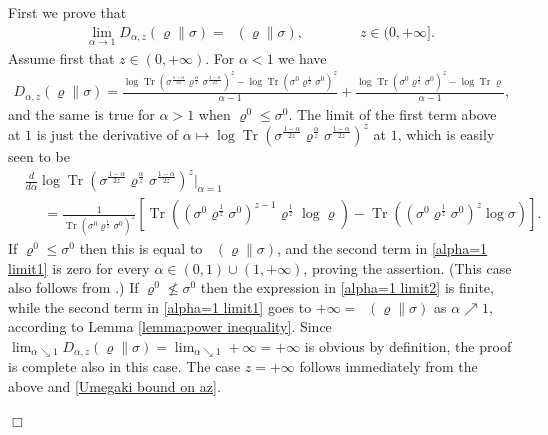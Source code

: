 \documentclass[unsortedaddress,superscriptaddress,pra,notitlepage]{revtex4}
\newenvironment{proof}[1][Proof]{\begin{trivlist}
\item[\hskip \labelsep {\bfseries #1}]}{\hfill$\Box$\end{trivlist}}
\newcommand{\nn}{\nonumber \\}
\def\rho{\varrho}
\def\bz{\left(}
\def\jz{\right)}
\def\nn{\nonumber}
\newcommand{\ds}{\mbox{ }\mbox{ }}
\DeclareMathOperator{\Tr}{Tr}
\DeclareMathOperator{\DU}{\mathit{D}^{Um}}
\begin{document}
\begin{proof}
First we prove that 
\begin{align}\label{alpha=1 limit3}
\lim_{\alpha\to 1}D_{\alpha,z}(\rho\|\sigma)
=
\DU(\rho\|\sigma),\ds\ds\ds z\in(0,+\infty].
\end{align}
Assume first that $z\in(0,+\infty)$.
For $\alpha<1$ we have
\begin{align}\label{alpha=1 limit1}
D_{\alpha,z}(\rho\|\sigma)=
\frac{\log\Tr\bz\sigma^{\frac{1-\alpha}{2z}}\rho^{\frac{\alpha}{z}}\sigma^{\frac{1-\alpha}{2z}}\jz^z
-\log\Tr\bz\sigma^0\rho^{\frac{1}{z}}\sigma^0\jz^z}{\alpha-1}
+\frac{\log\Tr\bz\sigma^0\rho^{\frac{1}{z}}\sigma^0\jz^z-\log\Tr\rho}{\alpha-1},
\end{align}
and the same is true for $\alpha>1$ when $\rho^0\le\sigma^0$.
The limit of the first term above at $1$ is just the derivative of 
$\alpha\mapsto\log\Tr\bz\sigma^{\frac{1-\alpha}{2z}}\rho^{\frac{\alpha}{z}}\sigma^{\frac{1-\alpha}{2z}}\jz^z$
at $1$, which is easily seen to be 
\begin{align}\label{alpha=1 limit2}
&\frac{d}{d\alpha}\log\Tr\bz\sigma^{\frac{1-\alpha}{2z}}\rho^{\frac{\alpha}{z}}\sigma^{\frac{1-\alpha}{2z}}\jz^z\Big\vert_{\alpha=1}\nn\\
&\ds=
\frac{1}{\Tr\bz\sigma^0\rho^{\frac{1}{z}}\sigma^0\jz^z}
\left[\Tr\bz\bz\sigma^0\rho^{\frac{1}{z}}\sigma^0\jz^{z-1}\rho^{\frac{1}{z}}\log\rho\jz
-\Tr\bz\bz\sigma^0\rho^{\frac{1}{z}}\sigma^0\jz^{z}\log\sigma\jz
\right].
\end{align}
If $\rho^0\le\sigma^0$ then this is equal to $\DU(\rho\|\sigma)$, and the second term in 
\eqref{alpha=1 limit1} is zero for every $\alpha\in(0,1)\cup(1,+\infty)$, proving the assertion. 
(This case also follows from \cite[Proposition 3]{LinTomamichel15}.)
If $\rho^0\nleq \sigma^0$ then the expression in \eqref{alpha=1 limit2} is finite, while the second term in 
\eqref{alpha=1 limit1} goes to $+\infty=\DU(\rho\|\sigma)$ as $\alpha\nearrow 1$, according to Lemma \ref{lemma:power inequality}. Since $\lim_{\alpha\searrow 1}D_{\alpha,z}(\rho\|\sigma)=\lim_{\alpha\searrow 1}+\infty=+\infty$ is obvious by definition, the proof is complete also in this case.
The case $z=+\infty$ follows immediately from the above and 
\eqref{Umegaki bound on az}.


\end{proof}
\end{document}

